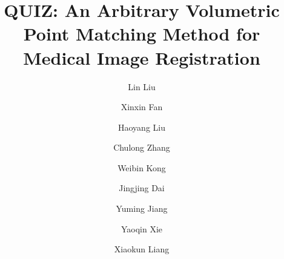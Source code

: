 \documentclass[preprint,review,12pt]{elsarticle}
\begin{document}
\begin{frontmatter}



\title{QUIZ: An Arbitrary Volumetric Point Matching Method for Medical Image Registration}

\author[label1,label2]{Lin Liu }
\author[label1,label2]{Xinxin Fan }
\author[label3]{Haoyang Liu}
\author[label1]{Chulong Zhang}
\author[label3]{Weibin Kong}
\author[label1]{Jingjing Dai}
\author[label3]{Yuming Jiang}
\author[label1]{Yaoqin Xie}
\author[label1]{Xiaokun Liang }

\address[label1]{Shenzhen Institute of Advanced Technology, Chinese Academy of Sciences, Shenzhen, 518055, China}
\address[label2]{University of Chinese Academy of Sciences, Beijing, 100049, China}
\address[label3]{Guangdong Medical University, Dongguan, 523808, China}    
\address[label4]{Department of Radiation Oncology, Stanford University, Stanford, 94305, USA}      





\end{frontmatter}
\end{document}
